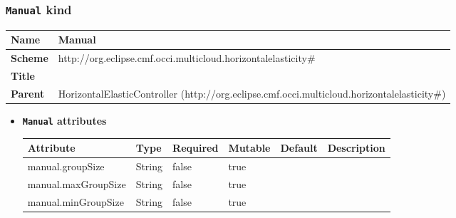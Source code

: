 \subsubsection{\texttt{Manual} kind}
\begin{center}
\begin{tabular}{|l|l|}
  \hline
  \textbf{Name} & Manual \\
  \hline  
  \textbf{Scheme} & http://org.eclipse.cmf.occi.multicloud.horizontalelasticity\# \\
  \hline
  \textbf{Title} &  \\
  \hline
  \textbf{Parent} & HorizontalElasticController (http://org.eclipse.cmf.occi.multicloud.horizontalelasticity\#) \\
  \hline
\end{tabular}
\end{center}
\begin{itemize}
\item \textbf{\texttt{Manual} attributes}

\begin{tabularx}{\textwidth}{|l|l|p{1.4cm}|p{1.3cm}|l|X|}
  \hline
  \textbf{Attribute} & \textbf{Type} & \textbf{Required} & \textbf{Mutable} & \textbf{Default} & \textbf{Description} \\
  \hline  
  manual.groupSize & String & false & true &  &  \\
  \hline
  manual.maxGroupSize & String & false & true &  &  \\
  \hline
  manual.minGroupSize & String & false & true &  &  \\
  \hline
\end{tabularx}
\end{itemize}



